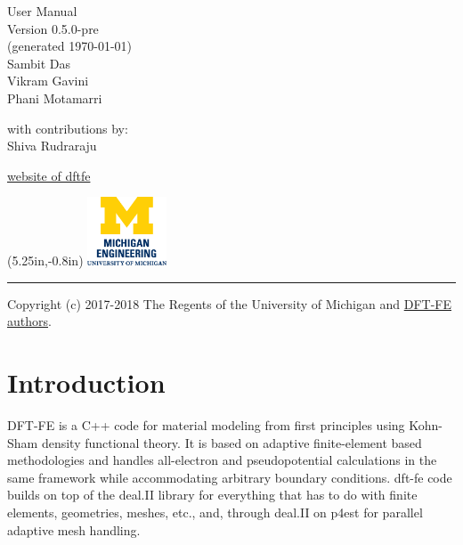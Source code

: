 \documentclass{article}
\begin{document}
{%
\color{dark_grey}
\hfill{\Huge \fontfamily{\sfdefault}\selectfont User Manual \\
\raggedleft \huge \fontfamily{\sfdefault}\selectfont Version
0.5.0-pre %
\\\large(generated \today)\\
{\Large Sambit Das\\Vikram Gavini\\Phani Motamarri\\}
}

\null
\vspace{17em}
\color{dark_grey}
{\fontfamily{\sfdefault}\selectfont
\large
\noindent with contributions by: \\
    Shiva Rudraraju\\
\vspace{1.0em}
}

{\noindent
{\fontfamily{\sfdefault}\selectfont \href{https://dftfe.org}{website of dftfe}}
}

\begin{textblock*}{0in}(5.25in,-0.8in)
\includegraphics[height=0.8in]{CoE-vert.png}
\end{textblock*}

{\noindent
\color{dark_grey}
\rule{\textwidth}{2pt}
}

}
Copyright (c) 2017-2018 The Regents of the University of Michigan and \hyperref[sec:authors]{DFT-FE authors}.
\pagebreak
{}


\pagebreak

\tableofcontents

\pagebreak

\section{Introduction}
DFT-FE is a C++ code for material modeling from first principles using Kohn-Sham density functional theory.
It is based on adaptive finite-element based methodologies and handles all-electron and pseudopotential calculations in the 
same framework while accommodating arbitrary boundary conditions. dft-fe code builds on top of the deal.II library for everything 
that has to do with finite elements, geometries, meshes, etc., and, through deal.II on p4est for parallel adaptive mesh handling.
\end{document}
